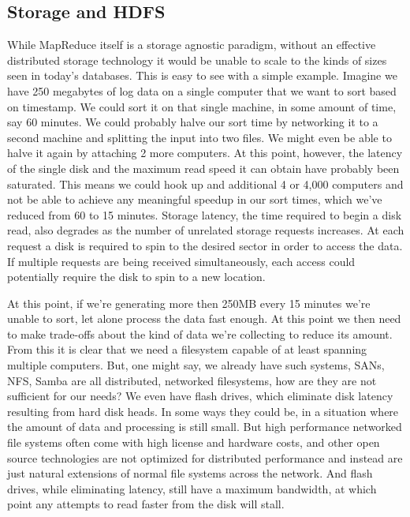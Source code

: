 \documentclass{article}
\begin{document}
\subsection{Storage and HDFS}
While MapReduce itself is a storage agnostic paradigm, without an effective distributed storage technology it would be unable to scale to the kinds of sizes seen in today's databases. This is easy to see with a simple example. Imagine we have 250 megabytes of log data on a single computer that we want to sort based on timestamp. We could sort it on that single machine, in some amount of time, say 60 minutes. We could probably halve our sort time by networking it to a second machine and splitting the input into two files. We might even be able to halve it again by attaching 2 more computers. At this point, however, the latency of the single disk and the maximum read speed it can obtain have probably been saturated. This means we could hook up and additional 4 or 4,000 computers and not be able to achieve any meaningful speedup in our sort times, which we've reduced from 60 to 15 minutes. Storage latency, the time required to begin a disk read, also degrades as the number of unrelated storage requests increases. At each request a disk is required to spin to the desired sector in order to access the data. If multiple requests are being received simultaneously, each access could potentially require the disk to spin to a new location. 

At this point, if we're generating more then 250MB every 15 minutes we're unable to sort, let alone process the data fast enough. At this point we then need to make trade-offs about the kind of data we're collecting to reduce its amount. From this it is clear that we need a filesystem capable of at least spanning multiple computers. But, one might say, we already have such systems, SANs, NFS, Samba are all distributed, networked filesystems, how are they are not sufficient for our needs? We even have flash drives, which eliminate disk latency resulting from hard disk heads. In some ways they could be, in a situation where the amount of data and processing is still small. But high performance networked file systems often come with high license and hardware costs, and other open source technologies are not optimized for distributed performance and instead are just natural extensions of normal file systems across the network. And flash drives, while eliminating latency, still have a maximum bandwidth, at which point any attempts to read faster from the disk will stall. 
\end{document}
